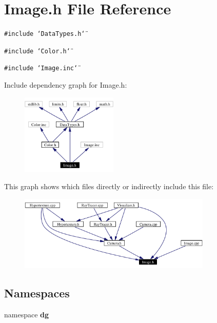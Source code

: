 \section{Image.h File Reference}
\label{Image_8h}
{\tt \#include \char`\"{}Data\-Types.h\char`\"{}}\par
{\tt \#include \char`\"{}Color.h\char`\"{}}\par
{\tt \#include \char`\"{}Image.inc\char`\"{}}\par


Include dependency graph for Image.h:\begin{figure}[H]
\begin{center}
\leavevmode
\includegraphics[width=130pt]{Image_8h__incl}
\end{center}
\end{figure}


This graph shows which files directly or indirectly include this file:\begin{figure}[H]
\begin{center}
\leavevmode
\includegraphics[width=260pt]{Image_8h__dep__incl}
\end{center}
\end{figure}
\subsection*{Namespaces}
\begin{CompactItemize}
\item 
namespace {\bf dg}
\end{CompactItemize}
